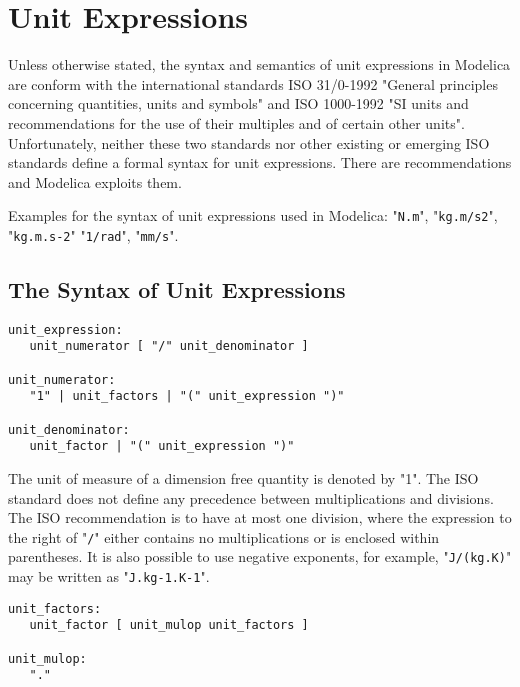 \chapter{Unit Expressions}

Unless otherwise stated, the syntax and semantics of unit expressions in
Modelica are conform with the international standards ISO 31/0-1992
"General principles concerning quantities, units and symbols" and ISO
1000-1992 "SI units and recommendations for the use of their multiples
and of certain other units". Unfortunately, neither these two standards
nor other existing or emerging ISO standards define a formal syntax for
unit expressions. There are recommendations and Modelica exploits them.

Examples for the syntax of unit expressions used in Modelica: "\lstinline[basicstyle=\ttfamily]!N.m!",
"\lstinline[basicstyle=\ttfamily]!kg.m/s2!", "\lstinline[basicstyle=\ttfamily]!kg.m.s-2!" "\lstinline[basicstyle=\ttfamily]!1/rad!", 
"\lstinline[basicstyle=\ttfamily]!mm/s!".

\section{The Syntax of Unit Expressions}
\begin{lstlisting}[language=grammar]
unit_expression:
   unit_numerator [ "/" unit_denominator ]
   
unit_numerator:
   "1" | unit_factors | "(" unit_expression ")"
   
unit_denominator:
   unit_factor | "(" unit_expression ")"
\end{lstlisting}

The unit of measure of a dimension free quantity is denoted by "1". The
ISO standard does not define any precedence between multiplications and
divisions. The ISO recommendation is to have at most one division, where
the expression to the right of "\lstinline[basicstyle=\ttfamily]!/!" either contains no multiplications or
is enclosed within parentheses. It is also possible to use negative
exponents, for example, "\lstinline[basicstyle=\ttfamily]!J/(kg.K)!" may be written as "\lstinline[basicstyle=\ttfamily]!J.kg-1.K-1!".

\begin{lstlisting}[language=grammar]
unit_factors:
   unit_factor [ unit_mulop unit_factors ]

unit_mulop:
   "."
\end{lstlisting}

